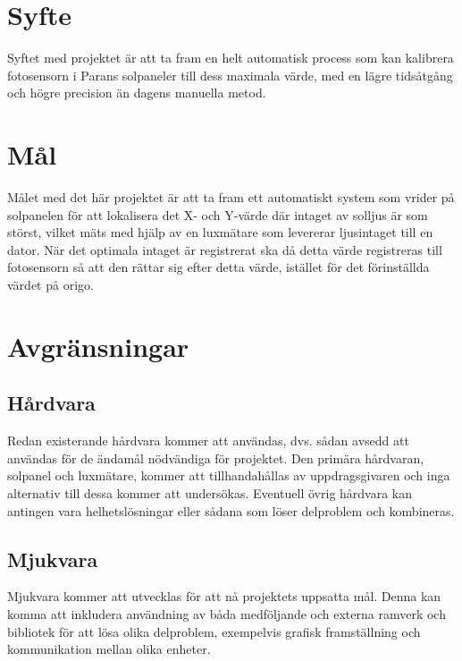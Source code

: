\documentclass[a4paper, 12pt]{article}
\begin{document}


\section{Syfte} %
\label{sec:syfte}
    Syftet med projektet är att ta fram en helt automatisk process som kan kalibrera fotosensorn i Parans solpaneler till dess maximala värde, med en lägre tidsåtgång och högre precision än dagens manuella metod.


\section{Mål} %
\label{sec:m_l}

    Målet med det här projektet är att ta fram ett automatiskt system som vrider på solpanelen för att lokalisera det X- och Y-värde där intaget av solljus är som störst, vilket mäts med hjälp av en luxmätare som levererar ljusintaget till en dator. När det optimala intaget är registrerat ska då detta värde registreras till fotosensorn så att den rättar sig efter detta värde, istället för det förinställda värdet på origo. 


\section{Avgränsningar} %
\label{sec:avgr_nsningar}
    \subsection{Hårdvara} %
    \label{subsec:h_rdvara}
    Redan existerande hårdvara kommer att användas, dvs. sådan avsedd att användas för de ändamål nödvändiga för projektet. Den primära hårdvaran, solpanel och luxmätare, kommer att tillhandahållas av uppdragsgivaren och inga alternativ till dessa kommer att undersökas. Eventuell övrig hårdvara kan antingen vara helhetslösningar eller sådana som löser delproblem och kombineras. \bigskip

    \subsection{Mjukvara} %
    \label{subsec:mjukvara}
    Mjukvara kommer att utvecklas för att nå projektets uppsatta mål. Denna kan komma att inkludera användning av båda medföljande och externa ramverk och bibliotek för att lösa olika delproblem, exempelvis grafisk framställning och kommunikation mellan olika enheter.
\end{document}
